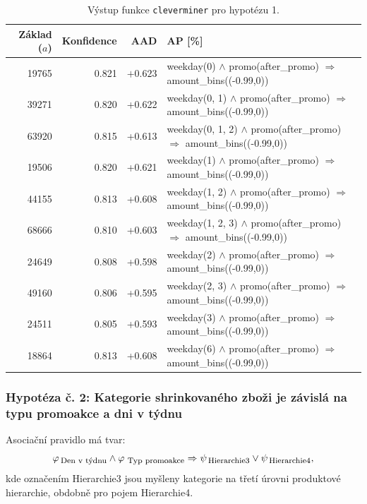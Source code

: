     \begin{table}[h!]
        \begin{center}
                \captionsetup{justification=centering}
        \caption{Výstup funkce \texttt{cleverminer} pro hypotézu 1.}
        \begin{tabular}{rrrp{7.5cm}}
            Základ ($a$) & Konfidence & AAD & AP [\%]\\
            \midrule
19765 & 0.821 & $+0.623$ & weekday(0) $\land$  promo(after\_promo) $\Rightarrow$ amount\_bins((-0.99,0)) \\
39271 & 0.820 & +0.622 & weekday(0, 1)  $\land$ promo(after\_promo) $\Rightarrow$ amount\_bins((-0.99,0)) \\
63920 & 0.815 & +0.613 & weekday(0, 1, 2)  $\land$ promo(after\_promo) $\Rightarrow$ amount\_bins((-0.99,0)) \\
19506 & 0.820 & +0.621 & weekday(1)  $\land$ promo(after\_promo) $\Rightarrow$ amount\_bins((-0.99,0)) \\
44155 & 0.813 & +0.608 & weekday(1, 2)  $\land$ promo(after\_promo) $\Rightarrow$ amount\_bins((-0.99,0)) \\
68666 & 0.810 & +0.603 & weekday(1, 2, 3)  $\land$ promo(after\_promo) $\Rightarrow$ amount\_bins((-0.99,0)) \\
24649 & 0.808 & +0.598 & weekday(2)  $\land$ promo(after\_promo) $\Rightarrow$ amount\_bins((-0.99,0)) \\
49160 & 0.806 & +0.595 & weekday(2, 3)  $\land$ promo(after\_promo) $\Rightarrow$ amount\_bins((-0.99,0)) \\
24511 & 0.805 & +0.593 &weekday(3) $\land$ promo(after\_promo) $\Rightarrow$ amount\_bins((-0.99,0)) \\
18864 & 0.813 & +0.608 &weekday(6)  $\land$ promo(after\_promo) $\Rightarrow$ amount\_bins((-0.99,0)) \\
       
            \end{tabular}
        \label{tab:H1vysl}
    \end{center}
    \end{table}

\subsubsection*{Hypotéza č. 2: Kategorie shrinkovaného zboži je závislá na typu promoakce a dni v týdnu}

Asociační pravidlo má tvar:
\begin{equation}
    \varphi_{\mbox{\,\footnotesize Den v týdnu}} \land \varphi_{\,\mbox{\,\footnotesize Typ promoakce}} \Rightarrow \psi_{\mbox{\,\footnotesize Hierarchie3}} \lor \psi_{\mbox{\,\footnotesize Hierarchie4}},
\end{equation}
kde označením Hierarchie3 jsou myšleny kategorie na třetí úrovni produktové hierarchie, obdobně pro pojem Hierarchie4.

